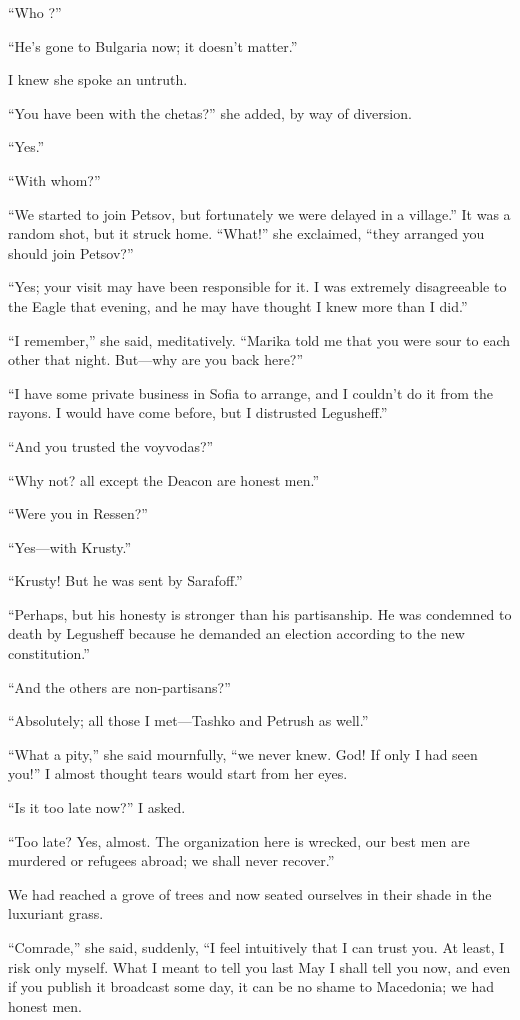 \documentclass[a5paper,12pt]{book}
\begin{document}
“Who ?” 

“He’s gone to Bulgaria now; it doesn’t matter.” 

I knew she spoke an untruth. 

“You have been with the chetas?” she added, by way of diversion. 

“Yes.” 

“With whom?” 

“We started to join Petsov, but fortunately we were delayed in a village.” It was a random shot, but it struck home.
“What!” she exclaimed, “they arranged you should join Petsov?” 

“Yes; your visit may have been responsible for it. I was extremely disagreeable to the Eagle that evening, and he may have thought I knew more than I did.” 

“I remember,” she said, meditatively. “Marika told me that you were sour to each other that night. But—why are you back here?” 

“I have some private business in Sofia to arrange, and I couldn’t do it from the rayons. I would have come before, but I distrusted Legusheff.” 

“And you trusted the voyvodas?” 

“Why not? all except the Deacon are honest men.” 

“Were you in Ressen?” 

“Yes—with Krusty.” 

“Krusty! But he was sent by Sarafoff.” 

“Perhaps, but his honesty is stronger than his partisanship. He was condemned to death by Legusheff because he demanded an election according to the new constitution.” 

“And the others are non-partisans?” 

“Absolutely; all those I met—Tashko and Petrush as well.” 

“What a pity,” she said mournfully, “we never knew. God! If only I had seen you!” I almost thought tears would start from her eyes. 

“Is it too late now?” I asked. 

“Too late? Yes, almost. The organization here is wrecked, our best men are murdered or refugees abroad; we shall never recover.” 

We had reached a grove of trees and now seated ourselves in their shade in the luxuriant grass. 

“Comrade,” she said, suddenly, “I feel intuitively that I can trust you. At least, I risk only myself. What I meant to tell you last May I shall tell you now, and even if you publish it broadcast some day, it can be no shame to Macedonia; we had honest men. 
\end{document}
